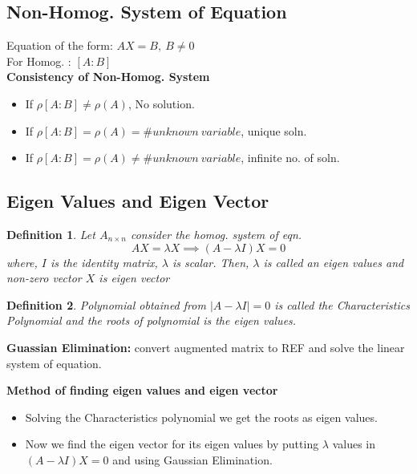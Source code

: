 \documentclass[12pt]{article}
\newtheorem*{defn}{Definition}
\begin{document}
\subsection*{Non-Homog. System of Equation}
Equation of the form: $AX=B, \: B \not=0$ \\
For Homog. : $[A:B]$ \\
\textbf{Consistency of Non-Homog. System}
\begin{itemize}
	\item If $\rho[A:B] \not= \rho(A)$, No solution.
	\item If $\rho [A:B] = \rho(A) = \# unknown\: variable$, unique soln.
	\item If $\rho [A:B] = \rho (A) \not = \# unknown \:variable$, infinite no. of soln.
\end{itemize}

\subsection*{Eigen Values and Eigen Vector}
\begin{defn}\normalfont
	Let $A_{n \times n}$ consider the homog. system of eqn.
	$$ AX = \lambda X \implies (A-\lambda I)X=0$$
	where, $I$ is the identity matrix, $\lambda$ is scalar. Then, $\lambda$ is called an \textit{eigen values} and non-zero vector $X$ is \textit{eigen vector}
\end{defn}
\begin{defn}\normalfont
	Polynomial obtained from $|A-\lambda I|=0$ is called the \textit{Characteristics Polynomial} and the roots of polynomial is the \textit{eigen values.}
\end{defn}

\textbf{Guassian Elimination: } convert augmented matrix to REF and solve the linear system of equation.

\textbf{Method of finding eigen values and eigen vector}
\begin{itemize}
	\item Solving the Characteristics polynomial we get the roots as eigen values.
	\item Now we find the eigen vector for its eigen values by putting $\lambda$ values in $(A-\lambda I)X=0$ and using Gaussian Elimination.
\end{itemize}
\end{document}
